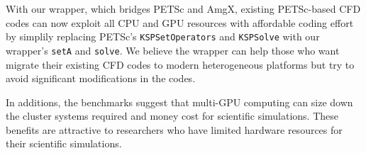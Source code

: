 With our wrapper, which bridges PETSc and AmgX, existing PETSc-based CFD codes 
can now exploit all CPU and GPU resources with affordable coding effort
by simplily replacing PETSc's
\lstinline[language=C++, basicstyle=\ttfamily]|KSPSetOperators| and 
\lstinline[language=C++, basicstyle=\ttfamily]|KSPSolve| 
with our wrapper's
\lstinline[language=C++, basicstyle=\ttfamily]|setA| and
\lstinline[language=C++, basicstyle=\ttfamily]|solve|. 
We believe the wrapper can help those who want migrate their existing CFD codes 
to modern heterogeneous platforms but try to avoid significant modifications 
in the codes.

In additions, the benchmarks suggest that multi-GPU computing can size down the 
cluster systems required and money cost for scientific simulations.
These benefits are attractive to researchers who have limited hardware resources
for their scientific simulations.
